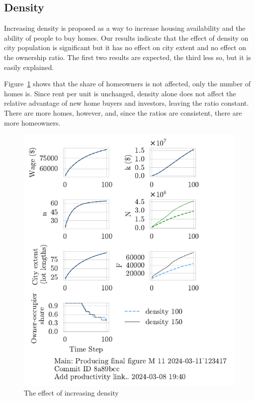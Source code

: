 \newpage
\subsection{Density}
Increasing density is proposed as a way to increase housing availability and the ability of people to buy homes. Our results indicate that the effect of density on city population is significant but it has no effect on city extent and no effect on the ownership ratio. The first two results are expected, the third less so, but it is easily explained. 

Figure~\ref{fig:density_ownership_trajectory} shows that the share of homeowners is not affected, only the number of homes is. Since rent per unit is unchanged, density alone does not affect the relative advantage of new home buyers and investors, leaving the ratio constant. There are more homes, however, and, since the ratios are consistent, there are more homeowners. 

\begin{figure}[h!bt]
    \centering
    \includegraphics[scale=1, trim={0 1.4cm 0 0},clip]{fig/density-Main-123417.pdf}
    \caption{The effect of increasing density}
    \label{fig:density_ownership_trajectory}
\end{figure}


